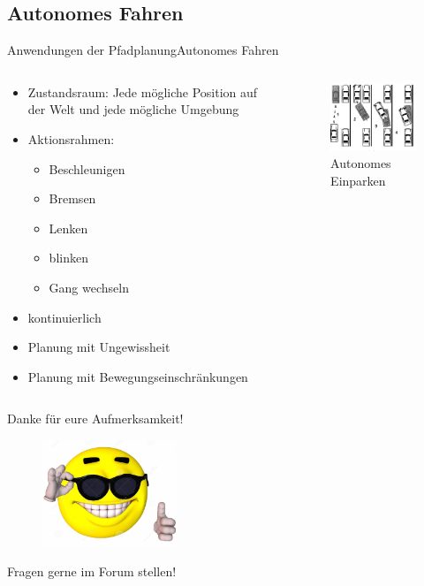\documentclass[t,aspectratio=169,dvipsnames]{beamer}
\begin{document}
\subsection{Autonomes Fahren}
\begin{frame}{Anwendungen der Pfadplanung}{Autonomes Fahren}
	\begin{columns}
		\begin{column}[T]{0.6\textwidth}
			\begin{itemize}[<+->]
				\item Zustandsraum: Jede mögliche Position auf der Welt und jede mögliche Umgebung
				\item Aktionsrahmen:
				\begin{itemize}[<2->]
					\item Beschleunigen
					\item Bremsen
					\item Lenken
					\item blinken
					\item Gang wechseln		
				\end{itemize}
				\item kontinuierlich
				\item Planung mit Ungewissheit
				\item Planung mit Bewegungseinschränkungen
			\end{itemize}
		\end{column}
		\begin{column}[T]{0.4\textwidth}
			\begin{figure}
				\includegraphics[width=6.0cm]{images/img239.png}
				\caption{Autonomes Einparken} 
			\end{figure}
		\end{column}
	\end{columns}
\end{frame}

\begin{frame}
\begin{center}
\huge Danke für eure Aufmerksamkeit!
\end{center}

\begin{figure}
	\includegraphics[width=4.0cm]{images/smiley.jpg}
	
\end{figure}
\begin{center}
	Fragen gerne im Forum stellen!
\end{center}
\end{frame}
\end{document}
